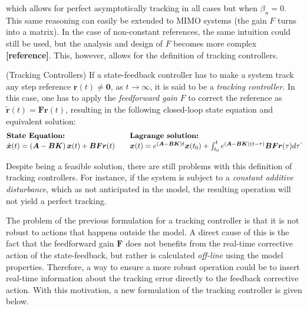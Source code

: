 \documentclass[a4paper,11pt]{book}
\numberwithin{figure}{chapter}
\numberwithin{equation}{chapter}
\numberwithin{table}{chapter}
\theoremstyle{definition}
\newtheorem{definition}{Definition}[chapter]
\newcounter{boxed-theorem}
\newcounter{boxed-definition}
\newenvironment{boxed-definition}[1]
{\colorlet{shadecolor}{pastelYellow!15} \begin{shaded} \begin{definition}{#1}}
{\end{definition} \end{shaded}}
\newcounter{boxed-example}
\begin{document}
\noindent which allows for perfect asymptotically tracking in all cases but when $\beta_n = 0$. This same reasoning can easily be extended to MIMO systems (the gain $F$ turns into a matrix). In the case of non-constant references, the same intuition could still be used, but the analysis and design of $F$ becomes more complex \textbf{[reference]}. This, however, allows for the definition of tracking controllers.

\begin{boxed-definition}{(Tracking Controllers)} \label{def:tracking}
    If a state-feedback controller has to make a system track any step reference $\bm{r}(t) \neq \bm{0}$, as $t \to \infty$, it is said to be a \textit{tracking controller}. In this case, one has to apply the \textit{feedforward gain} $F$ to correct the reference as $\tilde{\bm{r}}(t) = \bm{F}\bm{r}(t)$, resulting in the following closed-loop state equation and equivalent solution:
    \begin{align}
    \begin{matrix*}[l]
    \textbf{State Equation:} \hfill & & \textbf{Lagrange solution:} \hfill \\
    \dot{\bm{x}}(t) = \left( \bm{A} - \bm{B} \bm{K} \right) \bm{x}(t) + \bm{B} \bm{F} \bm{r}(t)  & &
    \bm{x}(t) = e^{(\bm{A} - \bm{B} \bm{K}) t} \bm{x}(t_0) + \int_{t_0}^{t} e^{(\bm{A} - \bm{B} \bm{K}) (t - \tau)} \bm{B} \bm{F} \bm{r}(\tau) d \tau \hfill
    \end{matrix*}
    .\end{align}
\end{boxed-definition}

Despite being a feasible solution, there are still problems with this definition of tracking controllers. For instance, if the system is subject to a \textit{constant additive disturbance}, which as not anticipated in the model, the resulting operation will not yield a perfect tracking. 

The problem of the previous formulation for a tracking controller is that it is not robust to actions that happens outside the model. A direct cause of this is the fact that the feedforward gain $\bm{F}$ does not benefits from the real-time corrective action of the state-feedback, but rather is calculated \textit{off-line} using the model properties. Therefore, a way to ensure a more robust operation could be to insert real-time information about the tracking error directly to the feedback corrective action. With this motivation, a new formulation of the tracking controller is given below.
\end{document}

